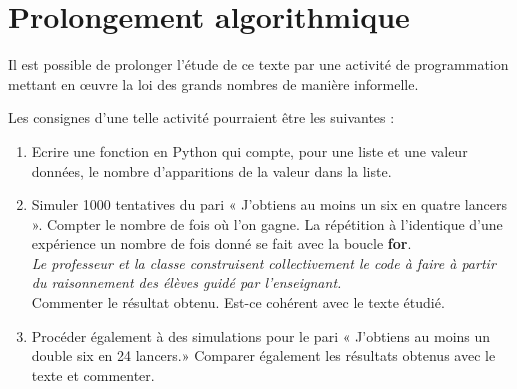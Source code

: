 \documentclass[frenchb]{article}
\begin{document}
\section*{Prolongement algorithmique}
Il est possible de prolonger l'étude de ce texte par une activité de programmation mettant en œuvre la loi des grands nombres de manière informelle. 

Les consignes d'une telle activité pourraient être les suivantes : 
\begin{enumerate}
\item Ecrire une fonction en Python qui compte, pour une liste et une valeur données, le nombre d'apparitions de la valeur dans la liste. 
\item Simuler 1000 tentatives du pari « J'obtiens au moins un six en quatre lancers ». Compter le nombre de fois où l'on gagne. La répétition à l'identique d'une expérience un nombre de fois donné se fait avec la boucle {\bf for}. \\ {\it Le professeur et la classe construisent collectivement le code à faire à partir du raisonnement des élèves guidé par l'enseignant. }\\
Commenter le résultat obtenu. Est-ce cohérent avec le texte étudié. 
\item Procéder également à des simulations pour le pari « J'obtiens au moins un double six en  24 lancers.» Comparer également les résultats obtenus avec le texte et commenter. 

\end{enumerate}
\end{document}
